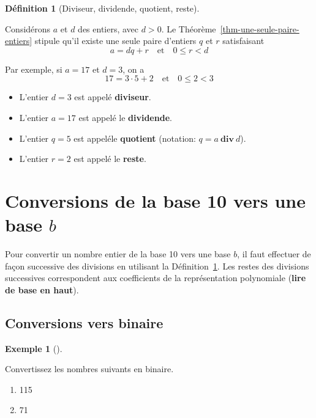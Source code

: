 \documentclass[
  letterpaper,
]{scrbook}
\providecommand{\tightlist}{%
  \setlength{\itemsep}{0pt}\setlength{\parskip}{0pt}}\usepackage{longtable,booktabs,array}
\theoremstyle{plain}
\theoremstyle{definition}
\newtheorem{definition}{Définition}[chapter]
\theoremstyle{definition}
\newtheorem{example}{Exemple}[chapter]
\theoremstyle{remark}
\begin{document}
\begin{definition}[Diviseur, dividende, quotient,
reste]\protect\hypertarget{def-diviseur-dividende-quotient-reste}{}\label{def-diviseur-dividende-quotient-reste}

Considérons \(a\) et \(d\) des entiers, avec \(d>0\). Le
Théorème~\ref{thm-une-seule-paire-entiers} stipule qu'il existe une
seule paire d'entiers \(q\) et \(r\) satisfaisant \[
a=dq+r \quad \text{et} \quad 0\leq r<d
\]

Par exemple, si \(a=17\) et \(d=3\), on a \[
17=3\cdot 5+2 \quad \text{et} \quad 0\leq 2<3
\]

\begin{itemize}
\tightlist
\item
  L'entier \(d=3\) est appelé \textbf{diviseur}.
\item
  L'entier \(a=17\) est appelé le \textbf{dividende}.
\item
  L'entier \(q=5\) est appeléle \textbf{quotient} (notation:
  \(q=a\ \mathbf{div}\ d\)).
\item
  L'entier \(r=2\) est appelé le \textbf{reste}.
\end{itemize}

\end{definition}

\hypertarget{conversions-de-la-base-10-vers-une-base-b}{%
\section{\texorpdfstring{Conversions de la base 10 vers une base
\(b\)}{Conversions de la base 10 vers une base b}}\label{conversions-de-la-base-10-vers-une-base-b}}

Pour convertir un nombre entier de la base 10 vers une base \(b\), il
faut effectuer de façon successive des divisions en utilisant la
Définition~\ref{def-diviseur-dividende-quotient-reste}. Les restes des
divisions successives correspondent aux coefficients de la
représentation polynomiale (\textbf{lire de base en haut}).

\hypertarget{conversions-vers-binaire}{%
\subsection{Conversions vers binaire}\label{conversions-vers-binaire}}

\begin{example}[]\protect\hypertarget{exm-conversion-vers-binaire}{}\label{exm-conversion-vers-binaire}

Convertissez les nombres suivants en binaire.

\begin{enumerate}
\def\labelenumi{\alph{enumi})}
\tightlist
\item
  115
\item
  71
\end{enumerate}

\end{example}
\end{document}
